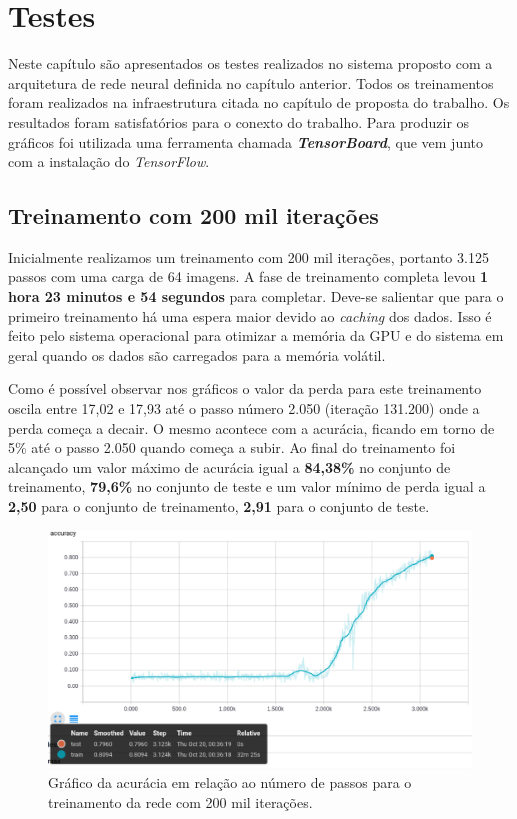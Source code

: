 \chapter{ Testes }

Neste capítulo são apresentados os testes realizados no sistema
proposto com a arquitetura de rede neural definida no capítulo
anterior. Todos os treinamentos foram realizados na infraestrutura
citada no capítulo de proposta do trabalho. Os resultados foram
satisfatórios para o conexto do trabalho. Para produzir os gráficos
foi utilizada uma ferramenta chamada {\bf \emph{TensorBoard}}, que vem
junto com a instalação do \textit{TensorFlow}.

\section{Treinamento com 200 mil iterações}

Inicialmente realizamos um treinamento com 200 mil iterações, portanto
3.125 passos com uma carga de 64 imagens. A fase de treinamento
completa levou {\bf 1 hora 23 minutos e 54 segundos} para
completar. Deve-se salientar que para o primeiro treinamento há uma
espera maior devido ao \textit{caching} dos dados. Isso é feito pelo
sistema operacional para otimizar a memória da GPU e do sistema em
geral quando os dados são carregados para a memória volátil. 

Como é possível observar nos gráficos o valor da perda para este
treinamento oscila entre 17,02 e 17,93 até o passo número 2.050
(iteração 131.200) onde a perda começa a decair. O mesmo acontece com
a acurácia, ficando em torno de 5\% até o passo 2.050 quando começa a
subir. Ao final do treinamento foi alcançado um valor máximo de
acurácia igual a {\bf 84,38\%} no conjunto de treinamento, {\bf
  79,6\%} no conjunto de teste e um valor mínimo de perda igual a {\bf
  2,50} para o conjunto de treinamento, {\bf 2,91} para o conjunto de
teste.

\begin{figure}[H]
\centering
\includegraphics[scale=0.4]{imagens/accuracy_200k}
\caption{Gráfico da acurácia em relação ao número de passos para o
  treinamento da rede com 200 mil iterações.}
\label{fig:accuracy_200k}
\end{figure}

